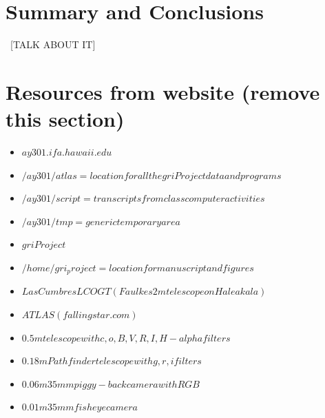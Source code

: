\documentclass[aps,prb,twocolumn,superscriptaddress]{revtex4-1}
\begin{document}
	



\section{Summary and Conclusions}
~[TALK ABOUT IT]


\section{Resources from website (remove this section)}
\begin{itemize}
	\item{} $ay301.ifa.hawaii.edu$
	\item{} $/ay301/atlas = location for all the gri Project data and programs$
	\item{} $/ay301/script = transcripts from class computer activities$
	\item{} $/ay301/tmp = generic temporary area$
	\item{} $gri Project$
	\item{} $/home/gri_project = location for manuscript and figures$
	\item{} $Las Cumbres LCOGT (Faulkes 2m telescope on Haleakala)$
	\item{} $ATLAS (fallingstar.com)$
	\item{} $0.5m telescope with c,o,B,V,R,I,H-alpha filters$
	\item{} $0.18m Pathfinder telescope with g,r,i filters$
	\item{} $0.06m 35mm piggy-back camera with RGB$
	\item{} $0.01m 35mm fisheye camera$
\end{itemize}
\end{document}
